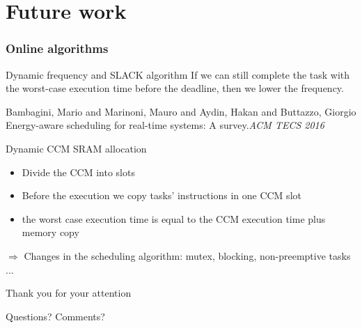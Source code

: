 \documentclass[
	11pt, %
]{beamer}
\begin{document}
\section{Future work}
\begin{frame}
	\frametitle{Online algorithms}
	\begin{block}{Dynamic frequency and SLACK algorithm}
		If we can still complete the task with the worst-case execution time before the deadline, then we lower the frequency. 
		\begin{thebibliography}{10}
			{\tiny
			\bibitem{} Bambagini, Mario and Marinoni, Mauro and Aydin, Hakan and Buttazzo, Giorgio
			\newblock Energy-aware scheduling for real-time systems: A survey.{\em{ACM TECS 2016}}
			}
		\end{thebibliography}
	\end{block}
	\begin{block}{Dynamic CCM SRAM allocation}
		\begin{itemize}
			\item Divide the CCM into slots
			\item Before the execution we copy tasks' instructions in one CCM slot
			\item the worst case execution time is equal to the CCM execution time plus memory copy
			
		\end{itemize}
		$\Rightarrow$ Changes in the scheduling algorithm: mutex, blocking, non-preemptive tasks $\ldots$

	\end{block}
\end{frame}





\begin{frame} %
	\begin{center}
		{\Huge Thank you for your attention}
		
		\bigskip\bigskip %
		
		{\LARGE Questions? Comments?}
	\end{center}
\end{frame}

\end{document}
